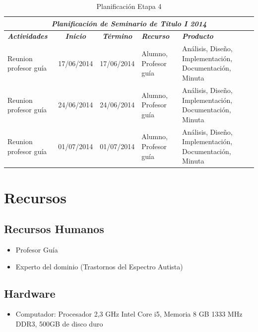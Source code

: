 \documentclass[12pt,letterpaper]{article}
\begin{document}
\begin{table}[htf]
\begin{tabular}{| p{4cm} | c | c | p{3cm}  | p{2.5cm} |}
\hline

\multicolumn{5}{|c|}{\textbf{\textit{Planificaci\'on de Seminario de T\'itulo I 2014}}} \\ \hline \hline
\textit{\textbf{Actividades}} & 
\textit{\textbf{Inicio}} & 
\textit{\textbf{T\'ermino}} & 
\centering \textit{\textbf{Recurso}} & 
\textit{\textbf{Producto}} \\ \hline \hline

Reunion profesor gu\'ia & 
17/06/2014 & 
17/06/2014 &  
Alumno, Profesor gu\'ia & 
An\'alisis, Dise\~no, Implementaci\'on, Documentaci\'on, Minuta\\ \hline

Reunion profesor gu\'ia & 
24/06/2014 & 
24/06/2014 &  
Alumno, Profesor gu\'ia & 
An\'alisis, Dise\~no, Implementaci\'on, Documentaci\'on, Minuta\\ \hline

Reunion profesor gu\'ia & 
01/07/2014 & 
01/07/2014 &  
Alumno, Profesor gu\'ia & 
An\'alisis, Dise\~no, Implementaci\'on, Documentaci\'on, Minuta\\ \hline

\hline
\end{tabular}
\caption{Planificaci\'on Etapa 4}
\end{table}




\newpage
\clearpage

\section{Recursos}
\label{rec}


\subsection{Recursos Humanos}
  \begin{itemize}
    \item Profesor Gu\'ia
    \item Experto del dominio (Trastornos del Espectro Autista)
  \end{itemize}
\subsection{Hardware}
\begin{itemize}
    \item Computador: Procesador 2,3 GHz Intel Core i5, Memoria 8 GB 1333 MHz DDR3, 
    500GB de disco duro
  \end{itemize}
\end{document}
